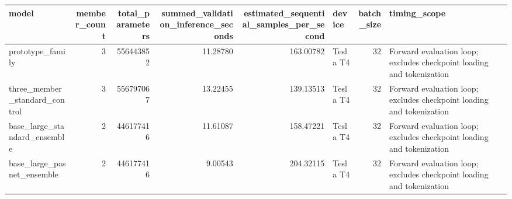 \begin{tabular}{lrrrrlrl}
\toprule
model & member\_count & total\_parameters & summed\_validation\_inference\_seconds & estimated\_sequential\_samples\_per\_second & device & batch\_size & timing\_scope \\
\midrule
prototype\_family & 3 & 556443852 & 11.28780 & 163.00782 & Tesla T4 & 32 & Forward evaluation loop; excludes checkpoint loading and tokenization \\
three\_member\_standard\_control & 3 & 556797067 & 13.22455 & 139.13513 & Tesla T4 & 32 & Forward evaluation loop; excludes checkpoint loading and tokenization \\
base\_large\_standard\_ensemble & 2 & 446177416 & 11.61087 & 158.47221 & Tesla T4 & 32 & Forward evaluation loop; excludes checkpoint loading and tokenization \\
base\_large\_pasnet\_ensemble & 2 & 446177416 & 9.00543 & 204.32115 & Tesla T4 & 32 & Forward evaluation loop; excludes checkpoint loading and tokenization \\
\bottomrule
\end{tabular}

